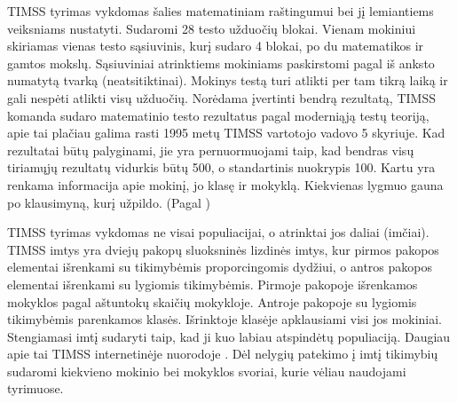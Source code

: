 \documentclass[12pt,a4paper]{article}
\begin{document}
\indent TIMSS tyrimas vykdomas šalies matematiniam raštingumui bei jį lemiantiems veiksniams nustatyti. Sudaromi 28 testo užduočių blokai. Vienam mokiniui skiriamas vienas testo sąsiuvinis, kurį sudaro 4 blokai, po du matematikos ir gamtos mokslų. Sąsiuviniai atrinktiems mokiniams paskirstomi pagal iš anksto numatytą tvarką (neatsitiktinai). Mokinys testą turi atlikti per tam tikrą laiką ir gali nespėti atlikti visų užduočių. Norėdama įvertinti bendrą rezultatą, TIMSS komanda sudaro matematinio testo rezultatus pagal moderniąją testų teoriją, apie tai plačiau galima rasti 1995 metų TIMSS vartotojo vadovo \cite{timss1995} 5 skyriuje. Kad rezultatai būtų palyginami, jie yra pernuormuojami taip, kad bendras visų tiriamųjų rezultatų vidurkis būtų 500, o standartinis nuokrypis 100. Kartu yra renkama informacija apie mokinį, jo klasę ir mokyklą. Kiekvienas lygmuo gauna po klausimyną, kurį užpildo. (Pagal \cite{timss2011lt})

\indent TIMSS tyrimas vykdomas ne visai populiacijai, o atrinktai jos daliai (imčiai). TIMSS imtys yra dviejų pakopų sluoksninės lizdinės imtys, kur pirmos pakopos elementai išrenkami su tikimybėmis proporcingomis dydžiui, o antros pakopos elementai išrenkami su lygiomis tikimybėmis. Pirmoje pakopoje išrenkamos mokyklos pagal aštuntokų skaičių mokykloje. Antroje pakopoje su lygiomis tikimybėmis parenkamos klasės. Išrinktoje klasėje apklausiami visi jos mokiniai. Stengiamasi imtį sudaryti taip, kad ji kuo labiau atspindėtų populiaciją. Daugiau apie tai TIMSS internetinėje nuorodoje \cite{2011Sample}. Dėl nelygių patekimo į imtį tikimybių sudaromi kiekvieno mokinio bei mokyklos svoriai, kurie vėliau naudojami tyrimuose.
\end{document}

